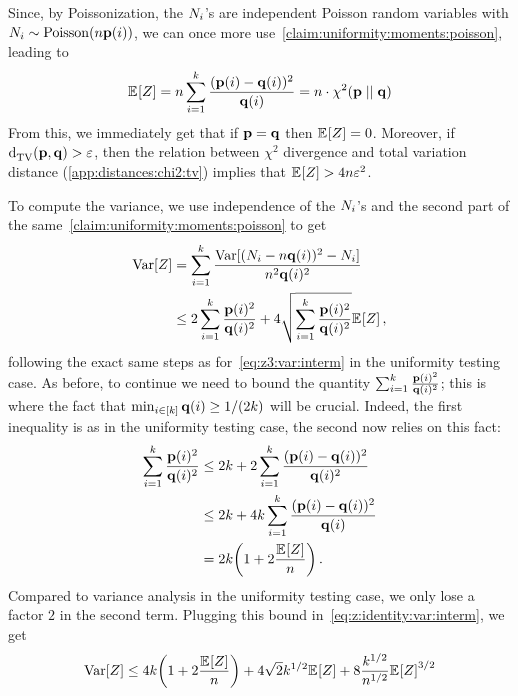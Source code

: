 Since, by Poissonization, the $N_i$'s are independent Poisson random variables with $\occur_i\sim\poisson{\ns\p(i)}$, we can once more use~\cref{claim:uniformity:moments:poisson}, leading to
\begin{equation}
  \label{eq:z:chisquare:identity:expectation}
    \bEE{Z} = \ns\sum_{i=1}^\ab \frac{(\p(i)-\q(i))^2}{\q(i)} = \ns\cdot\chisquare{\p}{\q}
\end{equation}
From this, we immediately get that if $\mathbf{p}=\mathbf{q}$ then $\bEE{Z}=0$. Moreover, if $\totalvardist{\p}{\q} > \dst$, then the relation between $\chi^2$ divergence and total variation distance (\cref{app:distances:chi2:tv}) implies that $\bEE{Z} > 4\ns\dst^2$.

To compute the variance, we use independence of the $N_i$'s and the second part of the same~\cref{claim:uniformity:moments:poisson} to get
\begin{align}
    \Var[Z]
    &= \sum_{i=1}^\ab \frac{\Var[(\occur_i-\ns\q(i))^2- \occur_i]}{\ns^2\q(i)^2} \notag\\
    &\leq 2\sum_{i=1}^\ab \frac{\p(i)^2}{\q(i)^2} + 4\sqrt{\sum_{i=1}^\ab \frac{\p(i)^2}{\q(i)^2}}\bEE{Z} \label{eq:z:identity:var:interm}\,,
\end{align}
following the exact same steps as for~\cref{eq:z3:var:interm} in the uniformity testing case. As before, to continue we need to bound the quantity $\sum_{i=1}^k \frac{\mathbf{p}(i)^2}{\mathbf{q}(i)^2}$; this is where the fact that $\min_{i\in[k]} \mathbf{q}(i) \geq 1/(2k)$ will be crucial. Indeed, the first inequality is as in the uniformity testing case, the second now relies on this fact:
\begin{align*}
    \sum_{i=1}^\ab \frac{\p(i)^2}{\q(i)^2}
    &\leq 2\ab + 2\sum_{i=1}^\ab \frac{(\p(i)-\q(i))^2}{\q(i)^2}  \\
    &\leq 2\ab + 4\ab\sum_{i=1}^\ab \frac{(\p(i)-\q(i))^2}{\q(i)} \\
    &= 2\ab\Paren{ 1 + 2\frac{\bEE{Z}}{\ns}  }\,.
\end{align*}
Compared to variance analysis in the uniformity testing case, we only lose a factor $2$ in the second term. Plugging this bound in~\cref{eq:z:identity:var:interm}, we get
\begin{equation}
    \Var[Z]
    \leq 4\ab\Paren{ 1 + 2\frac{\bEE{Z}}{\ns}  } + 4\sqrt{2}\ab^{1/2}\bEE{Z}+8\frac{\ab^{1/2}}{\ns^{1/2}} \bEE{Z}^{3/2} \label{eq:z:identity:var}
\end{equation}
